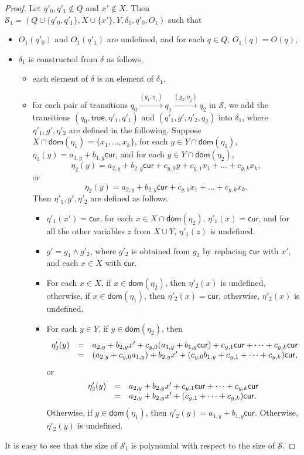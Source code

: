 \documentclass[runningheads,a4paper]{llncs}
\def\Ss{{\mathcal{S} }}
\newcommand\cur{\mathsf{cur}}
\newcommand\dom{\mathsf{dom}}
\newcommand\ltrue{\mathsf{true}}
\begin{document}
\begin{appendix}
\begin{proof}
Let $q'_{0},q'_{1} \not \in Q$ and $x' \not \in X$. Then $\Ss_1 = (Q \cup \{q'_{0},q'_1\}, X \cup \{x'\}, Y, \delta_1, q'_{0}, O_1)$ such that 
\begin{itemize}
\item $O_1(q'_0)$ and $O_1(q'_1)$ are undefined, and for each $q \in Q$, $O_1(q)=O(q)$,
%
\item $\delta_1$ is constructed from $\delta$ as follows,
\begin{itemize}
\item each element of $\delta$ is an element of $\delta_1$,
%
\item for each pair of transitions $q_0 \xrightarrow{(g_1,\eta_1)} q_1 \xrightarrow{(g_2,\eta_2)} q_2$ in $\Ss$, we add the transitions $(q_0, \ltrue, \eta'_1, q'_1)$ and $(q'_1, g', \eta'_2, q_2)$ into $\delta_1$, where $\eta'_1,g',\eta'_2$ are defined in the following. Suppose $X \cap \dom(\eta_1)=\{x_1,\dots,x_k\}$, for each $y \in Y \cap \dom(\eta_1)$, $\eta_1(y)=a_{1,y} + b_{1,y}\cur$, and for each $y \in Y \cap \dom(\eta_2)$, 
\[\eta_2(y)=a_{2,y} + b_{2,y} \cur + c_{y,0} y + c_{y,1} x_1 + \dots + c_{y,k} x_k,\] 
or 
\[
\eta_2(y)=a_{2,y} + b_{2,y} \cur + c_{y,1} x_1 + \dots + c_{y,k} x_k.
\]
Then $\eta'_1, g', \eta'_2$ are defined as follows.
\begin{itemize}
\item $\eta'_1(x')=\cur$, for each $x \in X \cap \dom(\eta_2)$, $\eta'_1(x)=\cur$, and for all the other variables $z$ from $X \cup Y$, $\eta'_1(z)$ is undefined.
%
\item $g' = g_1 \wedge g'_2$, where $g'_2$ is obtained from $g_2$ by replacing $\cur$ with $x'$, and each $x \in X$ with $\cur$.
%
\item For each $x \in X$, if $x \in \dom(\eta_2)$, then $\eta'_2(x)$ is undefined, otherwise, if $x \in \dom(\eta_1)$, then $\eta'_2(x)=\cur$, otherwise, $\eta'_2(x)$ is undefined.
%
\item For each $y \in Y$, if $y \in \dom(\eta_2)$, then 
\[
\begin{array}{l c l}
\eta'_2(y) & = & a_{2,y} + b_{2,y} x' + c_{y,0} (a_{1,y} + b_{1,y}\cur) + c_{y,1} \cur + \dots + c_{y,k} \cur \\
& = & (a_{2,y} + c_{y,0} a_{1,y}) + b_{2,y} x' + (c_{y,0} b_{1,y}  + c_{y,1} + \dots + c_{y,k} )\cur,
\end{array}
\]
or 
\[
\begin{array}{l c l}
\eta'_2(y) & = & a_{2,y} + b_{2,y} x' + c_{y,1} \cur + \dots + c_{y,k} \cur \\
& = & a_{2,y} + b_{2,y} x' + (c_{y,1} + \dots + c_{y,k} )\cur.
\end{array}
\]
%
Otherwise, if $y \in \dom(\eta_1)$, then $\eta'_2(y)= a_{1,y} + b_{1,y} \cur$. Otherwise, $\eta'_2(y)$ is undefined.
\end{itemize}
\end{itemize}
\end{itemize}
It is easy to see that the size of $\Ss_1$ is polynomial with respect to the size of $\Ss$.


\end{proof}
\end{appendix}
\end{document}
